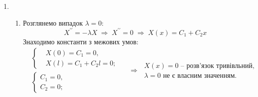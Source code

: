 \documentclass[a4paper, 14pt]{extreport}
\begin{document}
\begin{enumerate}
    \item[] \begin{enumerate}
        \item Розглянемо випадок $\lambda = 0$:
        \begin{equation*}
            X^{\prime\prime} = -\lambda X
            \;\Rightarrow\;
            X^{\prime\prime} = 0
            \;\Rightarrow\;
            X(x) = C_1 + C_2 x
        \end{equation*}
        Знаходимо константи з межових умов:
        \begin{equation*}
            \begin{aligned}
                &\left\{ \begin{aligned}
                    &X(0) = C_1 = 0, \\ 
                    &X(l) = C_1 + C_2 l = 0;
                \end{aligned} \right.
                \\   
                &\left\{ \begin{aligned}
                    C_1 = 0, \\ 
                    C_2 = 0;
                \end{aligned} \right.
            \end{aligned}
            \quad\Rightarrow\;
            \begin{aligned}
                X(x) = 0 \text{ -- розв'язок тривівльний,}\\
                \lambda = 0 \text{ не є власним значенням.}
            \end{aligned}
        \end{equation*}
    

\end{enumerate}
\end{enumerate}
\end{document}

